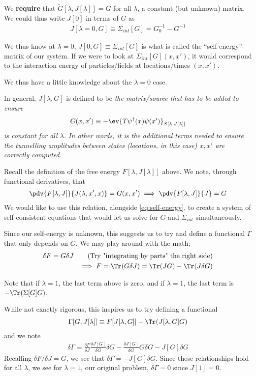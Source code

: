 \documentclass{article}
\begin{document}
We \textbf{require} that $\tilde G[\lambda, J[\lambda]] = G$ for all $\lambda$, a constant (but unknown) matrix. We could thus write $J[0]$ in terms of $G$ as
\begin{align}\label{eq:self-energy}
  J[\lambda=0, G] \equiv \Sigma_{int}[G] = G_0^{-1} - G^{-1}
\end{align}

We thus know at $\lambda=0$, $J[0, G] \equiv \Sigma_{int}[G]$ is what is called the ``self-energy'' matrix of our system. If we were to look at $\Sigma_{int}[G](x, x')$, it would correspond to the interaction energy of particles/fields at locations/times $(x, x')$.

We thus have a little knowledge about the $\lambda=0$ case.
\begin{definition*}
  In general, $J[\lambda, G]$ is defined to be \textit{the matrix/source that has to be added to ensure }
  \begin{align*}
    G(x, x') \equiv -\ev{T \psi^\dagger (x) \psi(x')}_{S[\lambda, J[\lambda]]}
  \end{align*}
\textit{is constant for all $\lambda$. In other words, it is the additional terms needed to ensure the tunnelling amplitudes between states (locations, in this case) $x, x'$ are correctly computed.} 
\end{definition*}

Recall the definition of the free energy $F[\lambda, J[\lambda]]$ above. We note, through functional derivatives, that
\begin{align*}
  \pdv{F[\lambda, J]}{J( \lambda, x', x)} = G(x, x') \implies \pdv{F[\lambda, J]}{J} = G
\end{align*}
We would like to use this relation, alongside \eqref{eq:self-energy}, to create a system of self-consistent equations that would let us solve for $G$ and $\Sigma_{int}$ simultaneously. 

Since our self-energy is unknown, this suggests us to try and define a functional $\Gamma$ that only depends on $G$. We may play around with the math;
\begin{align*}
  \delta F = G \delta J \tag{Try "integrating by parts" the right side} \\
  \implies F = \Tr(G \delta J) = \Tr(JG) - \Tr(J \delta G )
\end{align*}
\begin{remark}
  Note that if $\lambda = 1$, the last term above is zero, and if $\lambda=1$, the last term is $-\Tr(\Sigma[G] G)$. 
\end{remark}
While not exactly rigorous, this inspires us to try defining a functional
\begin{align*}
  \Gamma[G, J[\lambda]] \equiv F[J[\lambda, G]] - \Tr(J[\lambda, G]G)
\end{align*}
and we note
\begin{align*}
  \delta \Gamma = \frac{\delta F}{\delta J} \frac{\delta J[G]}{\delta G} \delta G - \frac{\delta J[G]}{\delta G} G \delta G - J[G] \delta G
\end{align*}
Recalling $\delta F/\delta J = G$, we see that $\delta \Gamma = -J[G] \delta G$. Since these relationships hold for all $\lambda$, we see for $\lambda = 1$, our original problem, $\delta \Gamma = 0$ since $J[1] = 0$. 
\end{document}

